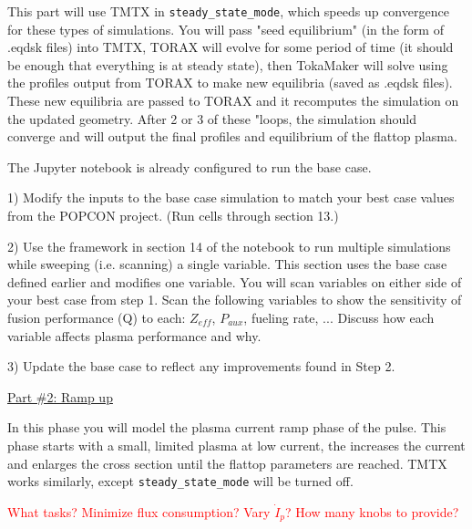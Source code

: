 \documentclass[letterpaper,12pt]{article}
\begin{document}
This part will use TMTX in \texttt{steady\_state\_mode}, which speeds up convergence for these types of simulations. You will pass "seed equilibrium" (in the form of .eqdsk files) into TMTX, TORAX will evolve for some period of time (it should be enough that everything is at steady state), then TokaMaker will solve using the profiles output from TORAX to make new equilibria (saved as .eqdsk files). These new equilibria are passed to TORAX and it recomputes the simulation on the updated geometry. After 2 or 3 of these "loops, the simulation should converge and will output the final profiles and equilibrium of the flattop plasma.

The Jupyter notebook is already configured to run the base case. 

1) Modify the inputs to the base case simulation to match your best case values from the POPCON project. (Run cells through section 13.)


2) Use the framework in section 14 of the notebook to run multiple simulations while sweeping (i.e. scanning) a single variable. This section uses the base case defined earlier and modifies one variable. You will scan variables on either side of your best case from step 1. Scan the following variables to show the sensitivity of fusion performance (Q) to each: $Z_{eff}$, $P_{aux}$, fueling rate, ... Discuss how each variable affects plasma performance and why.


3) Update the base case to reflect any improvements found in Step 2.


\newpage
\clearpage


\underline{Part \#2: Ramp up}

In this phase you will model the plasma current ramp phase of the pulse. This phase starts with a small, limited plasma at low current, the increases the current and enlarges the cross section until the flattop parameters are reached. TMTX works similarly, except \texttt{steady\_state\_mode} will be turned off. 

\textcolor{red}{What tasks? Minimize flux consumption? Vary $\dot{I}_p$? How many knobs to provide?}
\end{document}
